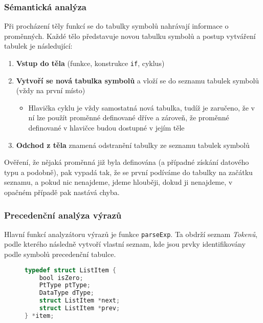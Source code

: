\documentclass[czech,a4paper,12pt]{article}[]
\begin{document}
\subsubsection{Sémantická analýza}
Při procházení těly funkcí se do tabulky symbolů nahrávají informace o proměnných. Každé tělo představuje novou tabulku symbolů a postup vytváření tabulek je následující:

\begin{enumerate}
    \item \textbf{Vstup do těla} (funkce, konstrukce \texttt{if}, cyklus)
    \item \textbf{Vytvoří se nová tabulka symbolů} a vloží se do seznamu tabulek symbolů (vždy na první místo)
    \begin{itemize}
        \item Hlavička cyklu je vždy samostatná nová tabulka, tudíž je zaručeno, že v ní lze použít proměnné definované dříve a zároveň, že proměnné definované v hlavičce budou dostupné v jejím těle
    \end{itemize}
    \item \textbf{Odchod z těla} znamená odstranění tabulky ze seznamu tabulek symbolů
\end{enumerate}

Ověření, že nějaká proměnná již byla definována (a případné získání datového typu a podobně), pak vypadá tak, že se první podíváme do tabulky na začátku seznamu, a pokud nic nenajdeme, jdeme hlouběji, dokud ji nenajdeme, v opačném případě pak nastává chyba.

\subsubsection{Precedenční analýza výrazů}
Hlavní funkcí analyzátoru výrazů je funkce \texttt{parseExp}. Ta obdrží seznam \emph{Tokenů}, podle kterého následně vytvoří vlastní seznam, kde jsou prvky identifikovány podle symbolů precedenční tabulce.

\begin{figure}[h!]
    \begin{lstlisting}[language=C, caption={Položka seznamu pro precedenční analýzu}, captionpos=b]
typedef struct ListItem {
    bool isZero;
    PtType ptType;
    DataType dType;
    struct ListItem *next;
    struct ListItem *prev;
} *item;
    \end{lstlisting}
\label{exprCode}
\end{figure}

\newpage
\end{document}
